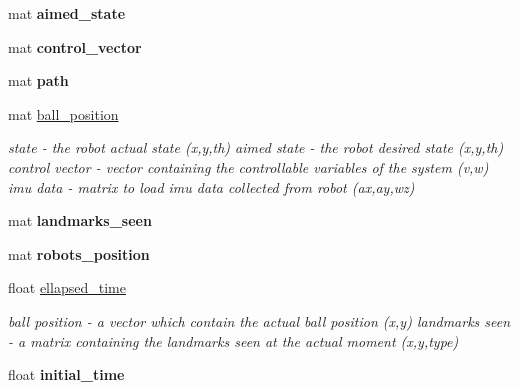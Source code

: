 \begin{DoxyCompactItemize}
\mbox{\label{class_robot_navigation_aaa625625a2ba01d1602891ea19691462}} 
mat {\bfseries aimed\+\_\+state}
\item 
\mbox{\label{class_robot_navigation_a73838ceedac8376f3c333fcbfcd4a364}} 
mat {\bfseries control\+\_\+vector}
\item 
\mbox{\label{class_robot_navigation_ac427c1bf3d5df9b984f9dfe4241d1454}} 
mat {\bfseries path}
\item 
\mbox{\label{class_robot_navigation_a1e4f1a5b3c01ba9be911c006b478f371}} 
mat \hyperlink{class_robot_navigation_a1e4f1a5b3c01ba9be911c006b478f371}{ball\+\_\+position}
\begin{DoxyCompactList}\small\item\em state -\/ the robot actual state (x,y,th) aimed state -\/ the robot desired state (x,y,th) control vector -\/ vector containing the controllable variables of the system (v,w) imu data -\/ matrix to load imu data collected from robot (ax,ay,wz) \end{DoxyCompactList}\item 
\mbox{\label{class_robot_navigation_ab40654dfb4a3593172da4b285734cdf5}} 
mat {\bfseries landmarks\+\_\+seen}
\item 
\mbox{\label{class_robot_navigation_a75aaeeea363d928d6dc8c6de90824d3f}} 
mat {\bfseries robots\+\_\+position}
\item 
\mbox{\label{class_robot_navigation_a4ccd950c2d302318d4635263096bc977}} 
float \hyperlink{class_robot_navigation_a4ccd950c2d302318d4635263096bc977}{ellapsed\+\_\+time}
\begin{DoxyCompactList}\small\item\em ball position -\/ a vector which contain the actual ball position (x,y) landmarks seen -\/ a matrix containing the landmarks seen at the actual moment (x,y,type) \end{DoxyCompactList}\item 
\mbox{\label{class_robot_navigation_a0aefa2162f9e8911625c977b134cd333}} 
float {\bfseries initial\+\_\+time}

\end{DoxyCompactItemize}
